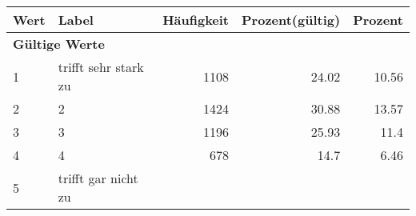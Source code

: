      \begin{longtable}{lXrrr}
     \toprule
     \textbf{Wert} & \textbf{Label} & \textbf{Häufigkeit} & \textbf{Prozent(gültig)} & \textbf{Prozent} \\
     \endhead
     \midrule
     \multicolumn{5}{l}{\textbf{Gültige Werte}}\\

     1 &
     \multicolumn{1}{X}{ trifft sehr stark zu   } &


       \num{1108} &
       \num[round-mode=places,round-precision=2]{24.02} &
         \num[round-mode=places,round-precision=2]{10.56} \\

     2 &
     \multicolumn{1}{X}{ 2   } &


       \num{1424} &
       \num[round-mode=places,round-precision=2]{30.88} &
         \num[round-mode=places,round-precision=2]{13.57} \\

     3 &
     \multicolumn{1}{X}{ 3   } &


       \num{1196} &
       \num[round-mode=places,round-precision=2]{25.93} &
         \num[round-mode=places,round-precision=2]{11.4} \\

     4 &
     \multicolumn{1}{X}{ 4   } &


       \num{678} &
       \num[round-mode=places,round-precision=2]{14.7} &
         \num[round-mode=places,round-precision=2]{6.46} \\

     5 &
     \multicolumn{1}{X}{ trifft gar nicht zu   } &



\end{longtable}

